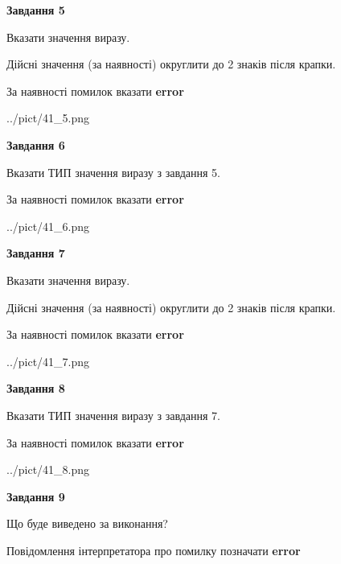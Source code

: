\documentclass[11pt, ukrainian]{article}
\begin{document}
{\begin {large}
{\begin {center}\textbf{Завдання 5}\end {center}}\par
Вказати значення виразу. \par
Дійсні значення (за наявності) округлити до 2 знаків після крапки. \par
За наявності помилок вказати \textbf{error}

\begin{center}
	{../pict/41_5.png}
\end{center}
\newpage

{\begin {center}\textbf{Завдання 6}\end {center}}\par
Вказати ТИП значення виразу з завдання 5. \par
За наявності помилок вказати \textbf{error}

\begin{center}
	{../pict/41_6.png}
\end{center}
\newpage

{\begin {center}\textbf{Завдання 7}\end {center}}\par
Вказати значення виразу. \par
Дійсні значення (за наявності) округлити до 2 знаків після крапки. \par
За наявності помилок вказати \textbf{error}

\begin{center}
	{../pict/41_7.png}
\end{center}
\newpage

{\begin {center}\textbf{Завдання 8}\end {center}}\par
Вказати ТИП значення виразу з завдання 7. \par
За наявності помилок вказати \textbf{error}

\begin{center}
	{../pict/41_8.png}
\end{center}
\newpage

{\begin {center}\textbf{Завдання 9}\end {center}}\par
Що буде виведено за виконання? \par
Повідомлення інтерпретатора про помилку позначати \textbf{error}


\end{large}}
\end{document}
